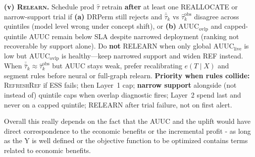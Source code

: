 \documentclass{article}
\begin{document}
\textbf{(v) \textsc{Relearn}.}
Schedule prod $\hat\tau$ retrain \textbf{after} at least one REALLOCATE or narrow-support trial if \textbf{(a)} DRPerm still rejects and $\bar{\hat\tau}_k$ vs $\widehat{\tau}^{\mathrm{obs}}_k$ disagree across quintiles (model level wrong under concept shift), or \textbf{(b)} $\mathrm{AUUC}_{\mathrm{ovlp}}$ and capped-quintile AUUC remain below SLA despite narrowed deployment (ranking not recoverable by support alone).
Do \textbf{not} RELEARN when only global $\mathrm{AUUC}_{\mathrm{live}}$ is low but $\mathrm{AUUC}_{\mathrm{ovlp}}$ is healthy---keep narrowed support and widen REF instead.
When $\bar{\hat\tau}_k\approx\widehat{\tau}^{\mathrm{obs}}_k$ but AUUC stays weak, prefer recalibrating $e(T\mid X)$ and segment rules before neural or full-graph relearn.
\textbf{Priority when rules collide:} \textsc{RefreshRef} if ESS fails; then Layer~1 cap; \textbf{narrow support} alongside (not instead of) quintile caps when overlap diagnostic fires; Layer~2 spend last and never on a capped quintile; RELEARN after trial failure, not on first alert. \\
\par Overall this really depends on the fact that the AUUC and the uplift would have direct correspondence to the economic benefits or the incremental profit - as long as the Y is well defined or the objective function to be optimized contains terms related to economic benefits.
\end{document}

